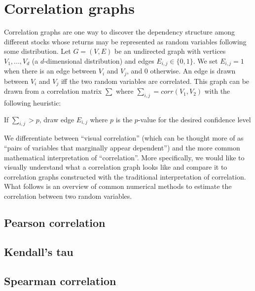 \section{Correlation graphs}
\label{sec:intro:correlation}

Correlation graphs are one way to discover the dependency structure among different stocks whose returns may be represented as random variables following some distribution. Let $G=(V,E)$ be an undirected graph with vertices $V_{1},...,V_{d}$ (a $d$-dimensional distribution) and edges $E_{i,j}\in\{0,1\}$. We set $E_{i,j}=1$ when there is an edge between $V_i$ and $V_j$, and 0 otherwise. An edge is drawn between $V_i$ and $V_j$ iff the two random variables are correlated. This graph can be drawn from a correlation matrix $\sum$ where $\sum_{i,j}=corr(V_1,V_2)$ with the following heuristic:\\

\begin{algorithm}
	If $\sum_{i,j}>p$, draw edge $E_{i,j}$ where $p$ is the $p$-value for the desired confidence level
\end{algorithm}

We differentiate between ``visual correlation'' (which can be thought more of as ``pairs of variables that marginally appear dependent'') and the more common mathematical interpretation of ``correlation''. More specifically, we would like to visually understand what a correlation graph looks like and compare it to correlation graphs constructed with the traditional interpretation of correlation. What follows is an overview of common numerical methods to estimate the correlation between two random variables.

\subsection{Pearson correlation}

\subsection{Kendall's tau}

\subsection{Spearman correlation}